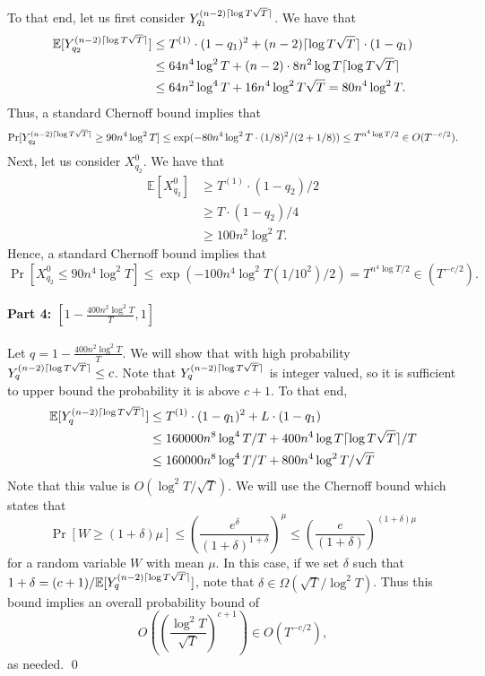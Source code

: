     To that end, let us first consider $Y^{(n - 2) \lceil\log T \sqrt{T}\rceil}_{q_1}$. We have that
\begin{align*}
    \mathbb{E}[Y^{(n - 2) \lceil\log T \sqrt{T}\rceil}_{q_2}] 
    &\le T^{(1)} \cdot (1 - q_1)^2 + (n - 2) \lceil\log T \sqrt{T}\rceil \cdot (1 - q_1)\\
    &\le 64n^4 \log^2 T + (n - 2) \cdot 8 n^2 \log T \lceil\log T \sqrt{T}\rceil\\
    &\le 64n^2 \log^4 T + 16n^4 \log^2 T \sqrt{T} = 80n^4 \log^2 T.
\end{align*}
Thus, a standard Chernoff bound implies that \[\Pr[Y^{(n - 2) \lceil\log T \sqrt{T}\rceil}_{q_2} \ge 90n^4 \log^2 T] \le \exp(- 80n^4\log^2 T \cdot (1/8)^2 / (2 + 1/8)) \le T^{n^4 \log T / 2} \in O(T^{-c/2}).\]
Next, let us consider $X^0_{q_2}$. We have that
\begin{align*}
    \mathbb{E}[X^0_{q_2}]
    &\ge T^{(1)} \cdot  (1 -q_2)/ 2\\
    &\ge T \cdot (1 - q_2) / 4\\
    & \ge 100n^2 \log^2 T. 
\end{align*}
Hence, a standard Chernoff bound implies that
\[
    \Pr[X^0_{q_2} \le 90 n^4 \log^2T] \le \exp(- 100n^4\log^2 T(1/10^2) / 2) = T^{n^4 \log T / 2} \in (T^{-c/2}).
\]

\paragraph{Part 4: $\left[1 - \frac{400n^2 \log^2T}{T}, 1 \right]$}
Let $q = 1 - \frac{400n^2 \log^2T}{T}$. We will show that with high probability $Y^{(n - 2) \lceil\log T \sqrt{T}\rceil}_{q} \le c$. Note that $Y^{(n - 2) \lceil\log T \sqrt{T}\rceil}_{q}$ is integer valued, so it is sufficient to upper bound the probability it is above $c + 1$. To that end,
\begin{align*}
    \mathbb{E}[Y^{(n - 2) \lceil\log T \sqrt{T}\rceil}_{q}] 
    &\le T^{(1)} \cdot (1 - q_1)^2 + L \cdot (1 - q_1)\\
    &\le 160000n^8\log^4 T / T +   400 n^4 \log T \lceil\log T \sqrt{T}\rceil / T\\
    &\le 160000n^8\log^4 T / T +   800 n^4 \log^2 T / \sqrt{T}\\
\end{align*}
Note that this value is $O(\log^2 T / \sqrt{T})$. We will use the Chernoff bound which states that
\[
		\Pr[W \ge (1 + \delta) \mu] \le \left(\frac{e^\delta}{(1 + \delta)^{1 + \delta}} \right)^\mu \leq  \left(\frac{e}{(1 + \delta)} \right)^{(1 + \delta)\mu}
\]
for a random variable $W$ with mean $\mu$. In this case, if we set $\delta$ such that $1 + \delta = (c + 1)/\mathbb{E}[Y^{(n - 2) \lceil\log T \sqrt{T}\rceil}_{q}]$, note that $\delta \in \Omega(\sqrt{T} / \log^2 T)$. Thus this bound implies an overall probability bound of \[O\left(\left(\frac{\log^2 T}{\sqrt{T}}\right)^{c + 1}\right) \in O(T^{-c/2}),\] as needed. \qed




